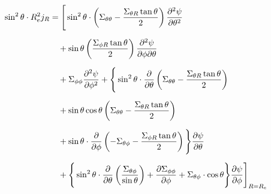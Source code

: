 \documentclass{article}
\begin{document}
\begin{equation*}
	\begin{aligned}
		\sin^2\theta \cdot R_e^2j_R
		 & =  \Bigg[
			\sin^2 \theta \cdot \left( \Sigma_{\theta\theta} - \frac{\Sigma_{\theta R} \tan\theta}{2} \right)
		\pdv[2]{\psi}{\theta}                                                         \\[6pt]
		 & \quad + \sin\theta
		\left( \frac{\Sigma_{\phi R} \tan\theta}{2} \right)
		\pdv{\psi}{\phi}{\theta}                                                      \\[6pt]
		 & \quad + \Sigma_{\phi\phi}
		\pdv[2]{\psi}{\phi} + \Bigg\{
		\sin^2\theta\cdot \pdv{\theta}
		\left( \Sigma_{\theta\theta} - \frac{\Sigma_{\theta R} \tan\theta}{2} \right) \\[6pt]
		 & \quad + \sin \theta\cos\theta
		\left( \Sigma_{\theta\theta} - \frac{\Sigma_{\theta R} \tan\theta}{2} \right) \\[6pt]
		 & \quad + \sin\theta\cdot
		\pdv{\phi}
		\left( -\Sigma_{\theta\phi} - \frac{\Sigma_{\phi R} \tan\theta}{2} \right)
		\Bigg\}\pdv{\psi}{\theta}                                                     \\[6pt]
		 & \quad + \Bigg\{\sin^2\theta\cdot\pdv{\theta}
		\left( \frac{\Sigma_{\theta\phi}}{\sin\theta} \right) +
		\pdv{\Sigma_{\phi\phi}}{\phi}
		+ \Sigma_{\theta\phi}\cdot\cos\theta
		\Bigg\}\pdv{\psi}{\phi}
		\Bigg]_{R = R_e}
	\end{aligned}
\end{equation*}
\end{document}
